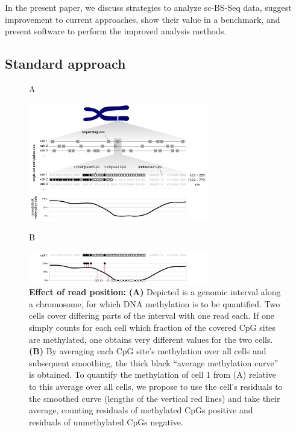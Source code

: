 \documentclass[twocolumn,10pt]{article}
\begin{document}
In the present paper, we discuss strategies to analyze sc-BS-Seq data, suggest improvement to current approaches, show their value in a benchmark, and present software to perform the improved analysis methods.

\subsection{Standard approach}

\begin{figure}
    \hspace{2.5cm}A\\[-7ex]
    \begin{center}
        \includegraphics[width=0.7\textwidth]{figures/Fig_residuals_A.png}\\
    \end{center}
    \hspace{2.5cm}B\\[-3ex]
    \begin{center}
        \includegraphics[width=0.7\textwidth]{figures/Fig_residuals_B.png}
    \end{center}
    \caption{\small \textbf{Effect of read position:} \textbf{(A)} Depicted is a genomic interval along a chromosome, for which DNA methylation is to be quantified. Two cells cover differing parts of the interval with one read each. If one simply counts for each cell which fraction of the covered CpG sites are methylated, one obtains very different values for the two cells. \textbf{(B)} By averaging each CpG site's methylation over all cells and subsequent smoothing, the thick black ``average methylation curve'' is obtained. To quantify the methylation of cell 1 from (A) relative to this average over all cells, we propose to use the cell's residuals to the smoothed curve (lengths of the vertical red lines) and take their average, counting residuals of methylated CpGs positive and residuals of unmethylated CpGs negative.}
    \label{fig:smoothres}
\end{figure}
\end{document}
